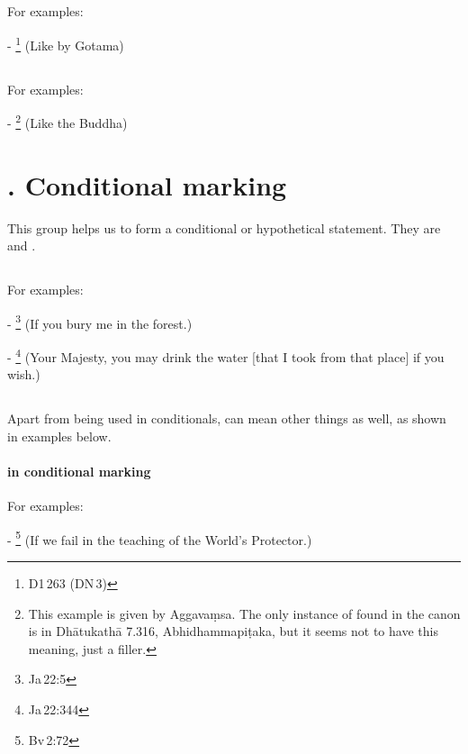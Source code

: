 \subsection*{}\label{nip:yathariva}
For examples:\par
- \footnote{D1\,263 (DN\,3)} (Like by Gotama) \par

\subsection*{}\label{nip:tathariva}
For examples:\par
- \footnote{This example is given by Aggava\d msa. The only instance of  found in the canon is in Dh\=atukath\=a 7.316, Abhidhammapi\d taka, but it seems not to have this meaning, just a filler.} (Like the Buddha) \par

\label{nipgrp12}
\section*{. Conditional marking}

This group helps us to form a conditional or hypothetical statement. They are  and .

\subsection*{}\label{nip:ce}\label{nip:sace}
For examples:\par
- \footnote{Ja\,22:5} (If you bury me in the forest.) \par
- \footnote{Ja\,22:344} (Your Majesty, you may drink the water [that I took from that place] if you wish.) \par

\subsection*{}\label{nip:yadi}
Apart from being used in conditionals,  can mean other things as well, as shown in examples below.
\paragraph*{ in conditional marking} For examples:\par
- \footnote{Bv\,2:72} (If we fail in the teaching of the World's Protector.) \par
